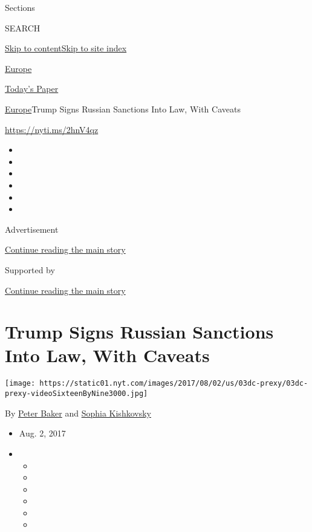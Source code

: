 Sections

SEARCH

\protect\hyperlink{site-content}{Skip to
content}\protect\hyperlink{site-index}{Skip to site index}

\href{https://www.nytimes.com/section/world/europe}{Europe}

\href{https://myaccount.nytimes.com/auth/login?response_type=cookie\&client_id=vi}{}

\href{https://www.nytimes.com/section/todayspaper}{Today's Paper}

\href{/section/world/europe}{Europe}\textbar{}Trump Signs Russian
Sanctions Into Law, With Caveats

\url{https://nyti.ms/2hnV4qz}

\begin{itemize}
\item
\item
\item
\item
\item
\item
\end{itemize}

Advertisement

\protect\hyperlink{after-top}{Continue reading the main story}

Supported by

\protect\hyperlink{after-sponsor}{Continue reading the main story}

\hypertarget{trump-signs-russian-sanctions-into-law-with-caveats}{%
\section{Trump Signs Russian Sanctions Into Law, With
Caveats}\label{trump-signs-russian-sanctions-into-law-with-caveats}}

\texttt{[image: https://static01.nyt.com/images/2017/08/02/us/03dc-prexy/03dc-prexy-videoSixteenByNine3000.jpg]}

By \href{http://www.nytimes.com/by/peter-baker}{Peter Baker} and
\href{https://www.nytimes.com/by/sophia-kishkovsky}{Sophia Kishkovsky}

\begin{itemize}
\item
  Aug. 2, 2017
\item
  \begin{itemize}
  \item
  \item
  \item
  \item
  \item
  \item
  \end{itemize}
\end{itemize}

